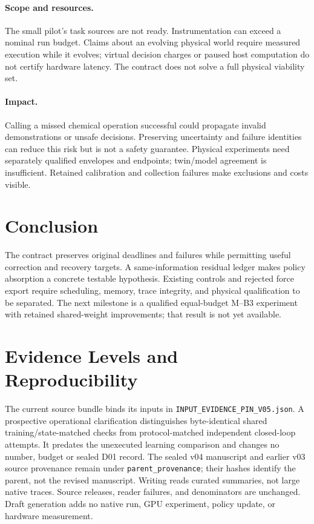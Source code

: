 \documentclass{article}
\begin{document}
\paragraph{Scope and resources.}
The small pilot's task sources are not ready. Instrumentation can exceed a nominal run budget. Claims about an evolving physical world require measured execution while it evolves; virtual decision charges or paused host computation do not certify hardware latency. The contract does not solve a full physical viability set.

\paragraph{Impact.}
Calling a missed chemical operation successful could propagate invalid demonstrations or unsafe decisions. Preserving uncertainty and failure identities can reduce this risk but is not a safety guarantee. Physical experiments need separately qualified envelopes and endpoints; twin/model agreement is insufficient. Retained calibration and collection failures make exclusions and costs visible.

\section{Conclusion}
The contract preserves original deadlines and failures while permitting useful correction and recovery targets. A same-information residual ledger makes policy absorption a concrete testable hypothesis. Existing controls and rejected force export require scheduling, memory, trace integrity, and physical qualification to be separated. The next milestone is a qualified equal-budget M--B3 experiment with retained shared-weight improvements; that result is not yet available.

\clearpage
\clearpage\appendix\onecolumn
\section{Evidence Levels and Reproducibility}
The current source bundle binds its inputs in \texttt{INPUT\_EVIDENCE\_PIN\_V05.json}. A prospective operational clarification distinguishes byte-identical shared training/state-matched checks from protocol-matched independent closed-loop attempts. It predates the unexecuted learning comparison and changes no number, budget or sealed D01 record. The sealed v04 manuscript and earlier v03 source provenance remain under \texttt{parent\_provenance}; their hashes identify the parent, not the revised manuscript. Writing reads curated summaries, not large native traces. Source releases, reader failures, and denominators are unchanged. Draft generation adds no native run, GPU experiment, policy update, or hardware measurement.
\end{document}
